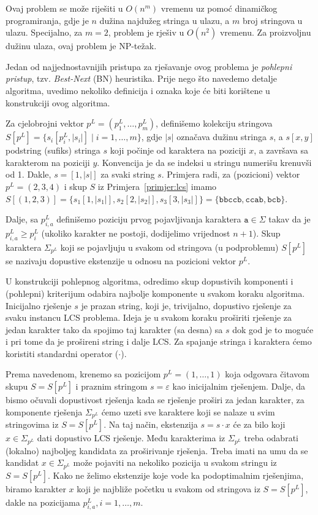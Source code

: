 \documentclass[a4paper, utf8, 11pt, colorlinks]{book}
\theoremstyle{definition}
\begin{document}
 Ovaj problem se može riješiti u $O(n^m)$ vremenu uz pomoć dinamičkog programiranja, gdje je $n$ dužina najdužeg stringa u ulazu, a $m$ broj stringova u ulazu. Specijalno, za  $m=2$, problem je rješiv u $O(n^2)$ vremenu. Za proizvoljnu dužinu ulaza, ovaj problem je NP-težak.  


Jedan od najjednostavnijih pristupa za rješavanje ovog problema je  \emph{pohlepni pristup}, tzv. \emph{Best-Next} (BN) heuristika. Prije nego što navedemo detalje algoritma, uvedimo nekoliko definicija i oznaka koje će biti korištene u konstrukciji ovog algoritma. 

Za cjelobrojni vektor $p^L = (p^L_1,\ldots, p^L_m)$, definišemo kolekciju stringova
$S[p^L] = \{s_i[p^L_i, |s_i|] \mid i=1,\ldots,m\}$, gdje $|s|$ označava dužinu stringa $s$, a $s[x,y]$ podstring (sufiks) stringa $s$ koji počinje od karaktera na poziciji $x$, a završava sa karakterom na poziciji $y$. Konvencija je da se indeksi u stringu numerišu krenuvši od 1. Dakle, $s= [1, |s|]$ za svaki string $s$. Primjera radi, za (pozicioni) vektor $p^L=(2,3,4)$ i skup $S$ iz Primjera~\ref{primjer:lcs} imamo $S[ (1,2,3)] = \{ s_1[1, |s_1|], s_2[2, |s_2|], s_3[3, |s_3|]  \}= \{ \texttt{bbccb}, \texttt{ccab}, \texttt{bcb}\}$. 

 
Dalje, sa $p^L_{i,a}$ definišemo poziciju prvog pojavljivanja karaktera $\texttt{a}\in \Sigma$ takav da je $p^L_{i,a} \geq p^L_i$ (ukoliko karakter ne postoji, dodijelimo vrijednost $n+1$). Skup karaktera $\Sigma_{p^L}$ koji se pojavljuju u svakom od stringova (u podproblemu) $S[p^L]$ se nazivaju dopustive ekstenzije u odnosu na pozicioni vektor $p^L$. 

U konstrukciji pohlepnog algoritma, odredimo  skup dopustivih komponenti i (pohlepni) kriterijum odabira najbolje komponente u svakom koraku algoritma. Inicijalno rješenje $s$ je prazan string, koji je, trivijalno, dopustivo rješenje za svaku instancu LCS problema. Ideja je u svakom koraku proširiti rješenje za jedan karakter tako da spojimo taj karakter (sa desna) sa $s$  dok god je to moguće i pri tome da je prošireni string i dalje LCS. Za spajanje stringa i karaktera ćemo koristiti standardni operator ($\cdot$).

 Prema navedenom, krenemo sa pozicijom $p^L = (1, \ldots, 1)$ koja odgovara čitavom skupu $S=S[p^L]$ i praznim stringom $s =\varepsilon$ kao inicijalnim rješenjem. Dalje, da bismo očuvali dopustivost rješenja kada se rješenje proširi za jedan karakter, za komponente rješenja $\Sigma_{p^L}$ ćemo uzeti sve karaktere koji se nalaze u svim stringovima iz $S=S[p^L]$. Na taj način,  ekstenzija $s = s \cdot x$  će za bilo koji $x \in \Sigma_{p^L}$ dati dopustivo LCS rješenje. Među karakterima iz $\Sigma_{p^L}$ treba odabrati (lokalno) najboljeg kandidata za proširivanje rješenja. Treba imati na umu da se kandidat $x\in \Sigma_{p^L}$ može pojaviti na nekoliko pozicija u svakom stringu iz $S=S[p^L]$. Kako ne želimo ekstenzije koje vode ka podoptimalnim rješenjima, biramo karakter $x$ koji je najbliže početku u svakom od stringova iz $S=S[p^L]$, dakle na pozicijama $p^L_{i,a},i=1,\ldots,m$. 
\end{document}
